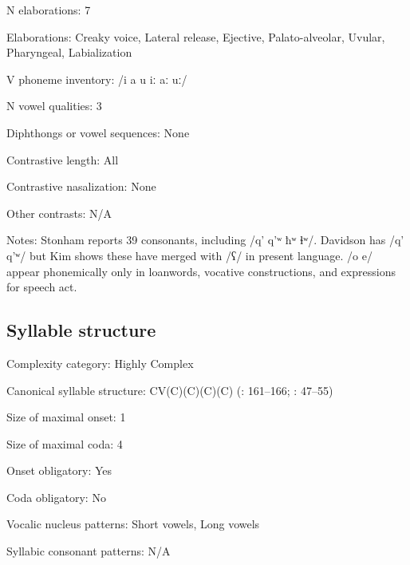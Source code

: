 {\begin{appendixdesc}
\item[N elaborations:] 7

\item[Elaborations:] Creaky voice, Lateral release, Ejective, Palato-alveolar, Uvular, Pharyngeal, Labialization

\item[V phoneme inventory:] /i a u iː aː uː/

\item[N vowel qualities:] 3

\item[Diphthongs or vowel sequences:] None

\item[Contrastive length:] All

\item[Contrastive nasalization:] None

\item[Other contrasts:] N/A

\item[Notes:] Stonham reports 39 consonants, including /q’ q’ʷ ħʷ ɬʷ/. Davidson has /q’ q’ʷ/ but Kim shows these have merged with /ʕ/ in present language. /o e/ appear phonemically only in loanwords, vocative constructions, and expressions for speech act.
\end{appendixdesc}
\subsection*{Syllable structure}
\begin{appendixdesc}

\item[Complexity category:] Highly Complex

\item[Canonical syllable structure:] CV(C)(C)(C)(C) (\citealt{Kim2003}: 161--166; \citealt{Stonham1999}: 47--55)

\item[Size of maximal onset:] 1

\item[Size of maximal coda:] 4

\item[Onset obligatory:] Yes

\item[Coda obligatory:] No

\item[Vocalic nucleus patterns:] Short vowels, Long vowels

\item[Syllabic consonant patterns:] N/A


\end{appendixdesc}}
